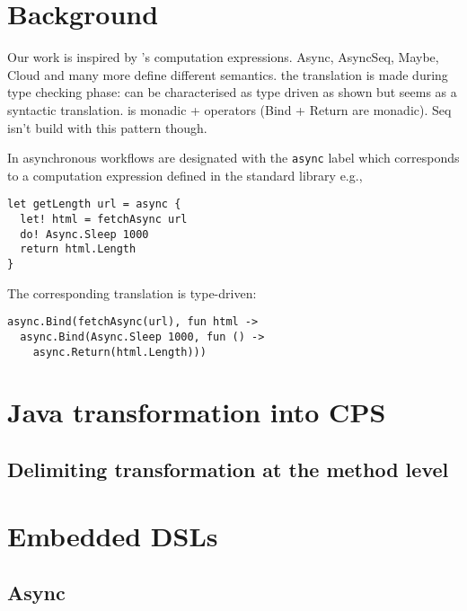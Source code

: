 \documentclass{sigplanconf}
\begin{document}
\section{Background}

Our work is inspired by \fs{}'s computation expressions. 
Async, AsyncSeq, Maybe, Cloud and many more define different semantics.
the translation is made during type checking phase:
can be characterised as type driven as shown 
but seems as a syntactic translation. 
\fs{} is monadic + operators (Bind + Return are monadic). Seq isn't build with this
pattern though. 


In \fs{} asynchronous workflows are designated with the \verb|async|
label which corresponds to a computation expression defined in the
standard library e.g.,

\begin{lstlisting}[style=fsharp]
let getLength url = async {
  let! html = fetchAsync url
  do! Async.Sleep 1000
  return html.Length
}
\end{lstlisting}

The corresponding translation is type-driven:

\begin{lstlisting}[style=fsharp]
async.Bind(fetchAsync(url), fun html ->
  async.Bind(Async.Sleep 1000, fun () ->
    async.Return(html.Length)))
\end{lstlisting}

\section{Java transformation into CPS}

\subsection{Delimiting transformation at the method level}

\section{Embedded DSLs}

\subsection{Async}
\end{document}
